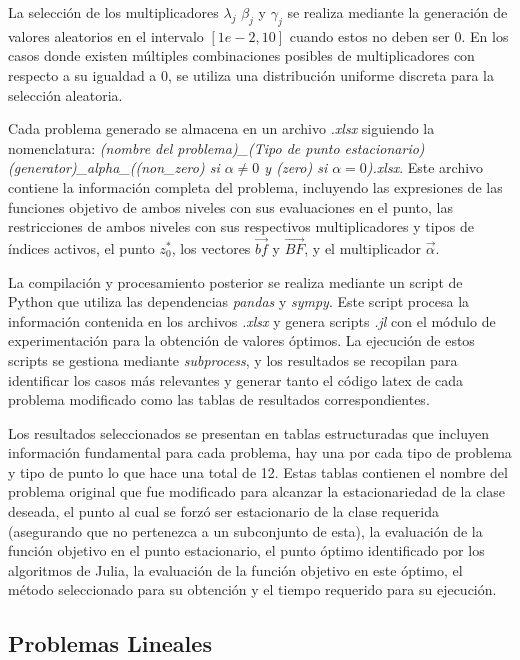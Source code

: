     La selección de los multiplicadores $\lambda_j$ $\beta_j$ y $\gamma_j$ se realiza mediante la generación de valores aleatorios en el intervalo $[1e-2, 10]$ cuando estos no deben ser $0$. En los casos donde existen múltiples combinaciones posibles de multiplicadores con respecto a su igualdad a $0$, se utiliza una distribución uniforme discreta para la selección aleatoria.
    
    Cada problema generado se almacena en un archivo \textit{.xlsx} siguiendo la nomenclatura: \textit{(nombre del problema)\_(Tipo de punto estacionario)(generator)\_alpha\_((non\_zero) si $\alpha \neq 0$ y (zero) si $\alpha = 0$).xlsx}. Este archivo contiene la información completa del problema, incluyendo las expresiones de las funciones objetivo de ambos niveles con sus evaluaciones en el punto, las restricciones de ambos niveles con sus respectivos multiplicadores y tipos de índices activos, el punto $z^*_0$, los vectores $\vec{bf}$ y $\vec{BF}$, y el multiplicador $\vec{\alpha}$.
    
    La compilación y procesamiento posterior se realiza mediante un script de Python que utiliza las dependencias \textit{pandas} y \textit{sympy}. Este script procesa la información contenida en los archivos \textit{.xlsx} y genera scripts \textit{.jl} con el módulo de experimentación para la obtención de valores óptimos. La ejecución de estos scripts se gestiona mediante \textit{subprocess}, y los resultados se recopilan para identificar los casos más relevantes y generar tanto el código latex de cada problema modificado como las tablas de resultados correspondientes.
    
    
    Los resultados seleccionados se presentan en tablas estructuradas que incluyen información fundamental para cada problema, hay una por cada tipo de problema y tipo de punto lo que hace una total de 12. Estas tablas contienen el nombre del problema original que fue modificado para alcanzar la estacionariedad de la clase deseada, el punto al cual se forzó ser estacionario de la clase requerida (asegurando que no pertenezca a un subconjunto de esta), la evaluación de la función objetivo en el punto estacionario, el punto óptimo identificado por los algoritmos de Julia, la evaluación de la función objetivo en este óptimo, el método seleccionado para su obtención y el tiempo requerido para su ejecución.


\subsection{Problemas Lineales} 
  

